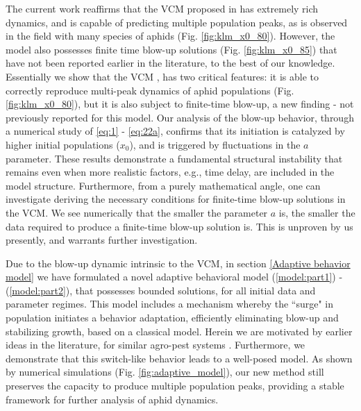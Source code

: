 \documentclass[sn-mathphys-num]{sn-jnl}
\numberwithin{equation}{section}
\numberwithin{equation}{section}
\begin{document}
The current work reaffirms that the VCM proposed in \cite{K07} has extremely rich dynamics, and is capable of predicting multiple population peaks, as is observed in the field with many species of aphids (Fig. \ref{fig:klm_x0_80}). However, the model also possesses finite time blow-up solutions (Fig. \ref{fig:klm_x0_85}) that have not been reported earlier in the literature, to the best of our knowledge. Essentially we show that the VCM \cite{K07}, has two critical features: it is able to correctly reproduce multi-peak dynamics of aphid populations (Fig. \ref{fig:klm_x0_80}), but it is also subject to finite-time blow-up, a new finding - not previously reported for this model. Our analysis of the blow-up behavior, through a numerical study of \eqref{eq:1} - \eqref{eq:22a}, confirms that its initiation is catalyzed by higher initial populations ($x_0$), and is triggered by fluctuations in the $a$ parameter. These results demonstrate a fundamental structural instability that remains even when more realistic factors, e.g., time delay, are included in the model structure. Furthermore, from a purely mathematical angle, one can investigate deriving the necessary conditions for finite-time blow-up solutions in the VCM. We see numerically that the smaller the parameter $a$ is, the smaller the data required to produce a finite-time blow-up solution is. This is unproven by us presently, and warrants further investigation.


Due to the blow-up dynamic intrinsic to the VCM, in section \ref{Adaptive behavior model} we have formulated a novel adaptive behavioral model (\ref{model:part1}) - (\ref{model:part2}), that possesses bounded solutions, for all initial data and parameter regimes. This model includes a mechanism whereby the ``surge" in population initiates a behavior adaptation, efficiently eliminating  blow-up and stabilizing growth, based on a classical model. Herein we are motivated by earlier ideas in the literature, for similar  agro-pest systems \cite{ainseba2023}. Furthermore, we demonstrate that this switch-like behavior leads to a well-posed model. As shown by numerical simulations (Fig. \ref{fig:adaptive_model}), our new method still preserves the capacity to produce multiple population peaks, providing a stable framework for further analysis of aphid dynamics.
\end{document}
